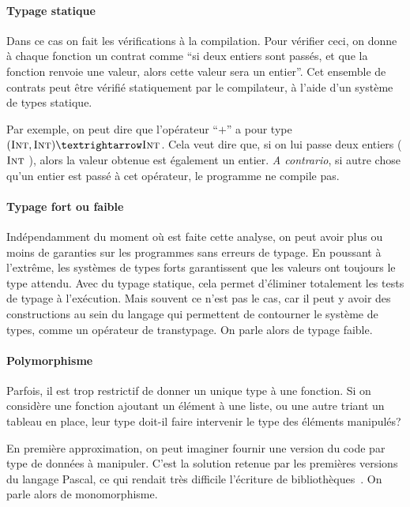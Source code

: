 \paragraph{Typage statique}

Dans ce cas on fait les vérifications à la compilation. Pour vérifier ceci, on
donne à chaque fonction un contrat comme \enquote{si deux entiers sont passés,
et que la fonction renvoie une valeur, alors cette valeur sera un entier}. Cet
ensemble de contrats peut être vérifié statiquement par le compilateur, à l'aide
d'un système de types statique.

Par exemple, on peut dire que l'opérateur \enquote{$+$} a pour type $(\tInt,
\tInt) → \tInt$. Cela veut dire que, si on lui passe deux entiers ($\textsc{Int}$
\tInt), alors la valeur obtenue est également un entier. \emph{A contrario}, si
autre chose qu'un entier est passé à cet opérateur, le programme ne compile pas.

\paragraph{Typage fort ou faible}

Indépendamment du moment où est faite cette analyse, on peut avoir plus ou moins
de garanties sur les programmes sans erreurs de typage. En poussant à l'extrême,
les systèmes de types forts garantissent que les valeurs ont toujours le type
attendu. Avec du typage statique, cela permet d'éliminer totalement les tests de
typage à l'exécution. Mais souvent ce n'est pas le cas, car il peut y avoir des
constructions au sein du langage qui permettent de contourner le système de
types, comme un opérateur de transtypage. On parle alors de typage faible.

\paragraph{Polymorphisme}

Parfois, il est trop restrictif de donner un unique type à une fonction. Si on
considère une fonction ajoutant un élément à une liste, ou une autre
triant un tableau en place, leur type doit-il faire intervenir le type des
éléments manipulés?

En première approximation, on peut imaginer fournir une version du code par type
de données à manipuler. C'est la solution retenue par les premières versions du
langage Pascal, ce qui rendait très difficile l'écriture de
bibliothèques~\cite{PascalNoEscape}. On parle alors de monomorphisme.

